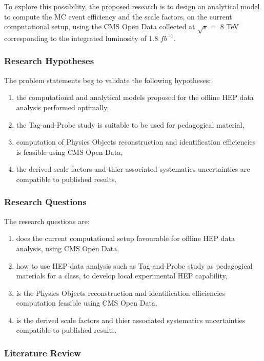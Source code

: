 \documentclass[]{article}
\begin{document}
To explore this possibility, the proposed research is to design an analytical model to compute the MC event efficiency and the scale factors, on the current computational setup, using the CMS Open Data collected at $\sqrt{s} =$ 8 TeV corresponding to the integrated luminosity of 1.8 $fb^{-1}$.

\subsubsection{Research Hypotheses}

The problem statements beg to validate the following hypotheses:

\begin{enumerate}
  \item the computational and analytical models proposed for the offline HEP data analysis performed optimally,
  \item the Tag-and-Probe study is suitable to be used for pedagogical material,
  \item computation of Physics Objects reconstruction and identification efficiencies is feasible using CMS Open Data,
  \item the derived scale factors and thier associated systematics uncertainties are compatible to published results.

\end{enumerate}

\subsubsection{Research Questions}

The research questions are:
\begin{enumerate}
  \item does the current computational setup favourable for offline HEP data analysis, using CMS Open Data,
  \item how to use HEP data analysis such as Tag-and-Probe study as pedagogical materials for a class, to develop local experimental HEP capability,
  \item is the Physics Objects reconstruction and identification efficiencies computation feasible using CMS Open Data,
  \item is the derived scale factors and thier associated systematics uncertainties compatible to published results.
\end{enumerate}

\subsubsection{Literature Review}
\end{document}
